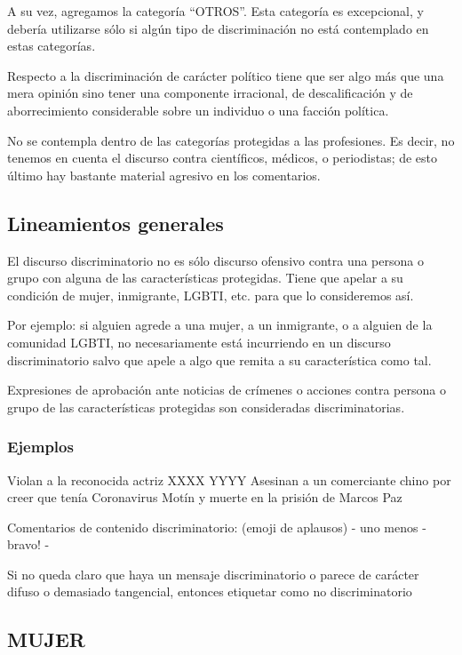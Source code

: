 A su vez, agregamos la categoría “OTROS”. Esta categoría es excepcional, y debería utilizarse sólo si algún tipo de discriminación no está contemplado en estas categorías.

Respecto a la discriminación de carácter político tiene que ser algo más que una mera opinión  sino tener una componente irracional, de descalificación y de aborrecimiento considerable sobre un individuo o una facción política.

No se contempla dentro de las categorías protegidas a las profesiones. Es decir, no tenemos en cuenta el discurso contra científicos, médicos, o periodistas; de esto último hay bastante material agresivo en los comentarios.


\subsection{Lineamientos generales}

El discurso discriminatorio no es sólo discurso ofensivo contra una persona o grupo con alguna de las características protegidas. Tiene que apelar a su condición de mujer, inmigrante, LGBTI, etc. para que lo consideremos así.

Por ejemplo: si alguien agrede a una mujer, a un inmigrante, o a alguien de la comunidad LGBTI, no necesariamente está incurriendo en un discurso discriminatorio salvo que apele a algo que remita a su característica como tal.


Expresiones de aprobación ante noticias de crímenes o acciones contra persona o grupo de las características protegidas son consideradas discriminatorias.

\subsubsection{Ejemplos}

Violan a la reconocida actriz XXXX YYYY
Asesinan a un comerciante chino por creer que tenía Coronavirus
Motín y muerte en la prisión de Marcos Paz

Comentarios de contenido discriminatorio: (emoji de aplausos) - uno menos - bravo! -


Si no queda claro que haya un mensaje discriminatorio o parece de carácter difuso o demasiado tangencial, entonces etiquetar como no discriminatorio




\subsection{MUJER}

